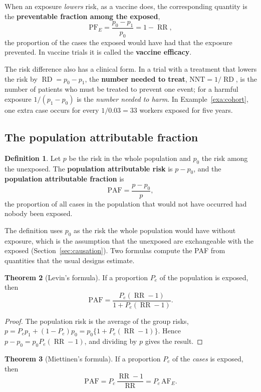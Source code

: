 \documentclass[11pt,a4paper]{article}
\numberwithin{equation}{section}
\DeclareMathOperator{\RR}{RR}
\DeclareMathOperator{\RD}{RD}
\theoremstyle{definition}
\newtheorem{thm}{Theorem}[subsection]
\newtheorem{defn}[thm]{Definition}
\begin{document}
When an exposure \emph{lowers} risk, as a vaccine does, the corresponding quantity is the \textbf{preventable fraction among the exposed},
\[
\text{PF}_E = \frac{p_0 - p_1}{p_0} = 1 - \RR ,
\]
the proportion of the cases the exposed would have had that the exposure prevented. In vaccine trials it is called the \textbf{vaccine
efficacy}.

The risk difference also has a clinical form. In a trial with a treatment that lowers the risk by $\RD = p_0 - p_1$, the \textbf{number
needed to treat}, $\text{NNT} = 1/\RD$, is the number of patients who must be treated to prevent one event; for a harmful exposure $1/(p_1 - p_0)$ is
the \emph{number needed to harm}. In Example~\ref{exa:cohort}, one extra case occurs for every $1/0.03 = 33$ workers exposed for five years.

\subsection{The population attributable fraction}

\begin{defn}
Let $p$ be the risk in the whole population and $p_0$ the risk among the unexposed. The \textbf{population attributable risk} is $p - p_0$, and
the \textbf{population attributable fraction} is
\[
\text{PAF} = \frac{p - p_0}{p} ,
\]
the proportion of all cases in the population that would not have occurred had nobody been exposed.
\end{defn}

The definition uses $p_0$ as the risk the whole population would have without exposure, which is the assumption that the unexposed are
exchangeable with the exposed (Section~\ref{sec:causation}). Two formulas compute the PAF from quantities that the usual designs estimate.

\begin{thm}[Levin's formula]
\label{thm:levin}
If a proportion $P_e$ of the population is exposed, then
\[
\text{PAF} = \frac{P_e(\RR - 1)}{1 + P_e(\RR - 1)} .
\]
\end{thm}

\begin{proof}
The population risk is the average of the group risks, $p = P_e p_1 + (1 - P_e)p_0 = p_0\{1 + P_e(\RR - 1)\}$. Hence $p - p_0 = p_0 P_e(\RR - 1)$, and dividing by $p$
gives the result.
\end{proof}

\begin{thm}[Miettinen's formula]
\label{thm:miettinen}
If a proportion $P_c$ of the \emph{cases} is exposed, then
\[
\text{PAF} = P_c\,\frac{\RR - 1}{\RR} = P_c\,\text{AF}_E .
\]
\end{thm}
\end{document}
